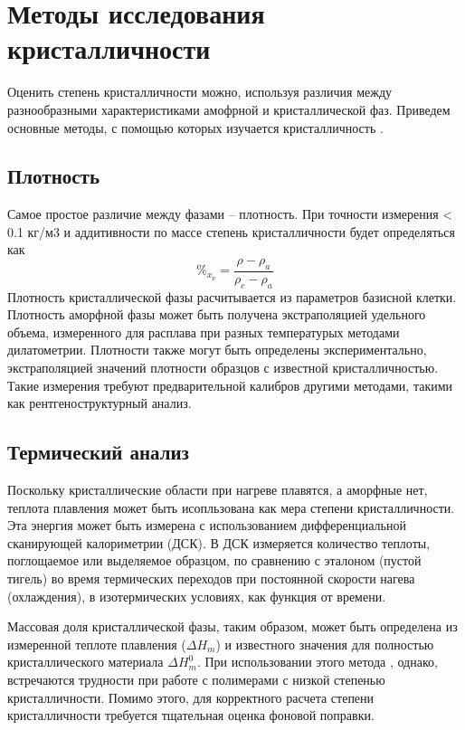 \section{Методы исследования кристалличности}

Оценить степень кристалличности можно, используя различия между разнообразными характеристиками амофрной и кристаллической фаз.
Приведем основные методы, с помощью которых изучается кристалличность \cite{cryst3}.

\subsection{Плотность}

Самое простое различие между фазами -- плотность. При точности измерения < 0.1 кг/м3 и аддитивности по массе степень кристалличности будет определяться как
\[
\%_{x_{\nu}} =\frac{\rho - \rho_a}{\rho_c-\rho_a}
\]
Плотность кристаллической фазы расчитывается из параметров базисной клетки. Плотность аморфной фазы может быть получена экстраполяцией удельного объема, измеренного для расплава при разных температурых методами дилатометрии. Плотности также могут быть определены экспериментально, экстраполяцией значений плотности образцов с известной кристалличностью. Такие измерения требуют предварительной калибров другими методами, такими как рентгеноструктурный анализ.

\subsection{Термический анализ}
Поскольку кристаллические области при нагреве плавятся, а аморфные нет, теплота плавления может быть исопльзована как мера степени кристалличности.
Эта энергия может быть измерена с использованием дифференциальной сканирующей калориметрии (ДСК). В ДСК измеряется количество теплоты, поглощаемое или выделяемое образцом, по сравнению с эталоном (пустой тигель) во время термических переходов при постоянной скорости нагева (охлаждения), в изотермических условиях, как функция от времени.

Массовая доля кристаллической фазы, таким образом, может быть определена из измеренной  теплоте плавления ($\Delta H_m$) и известного значения для полностью кристаллического материала $\Delta H^0_m$. При использовании этого метода , однако, встречаются трудности при работе с полимерами с низкой степенью кристалличности. Помимо этого, для корректного расчета степени кристалличности требуется тщательная оценка фоновой поправки.

